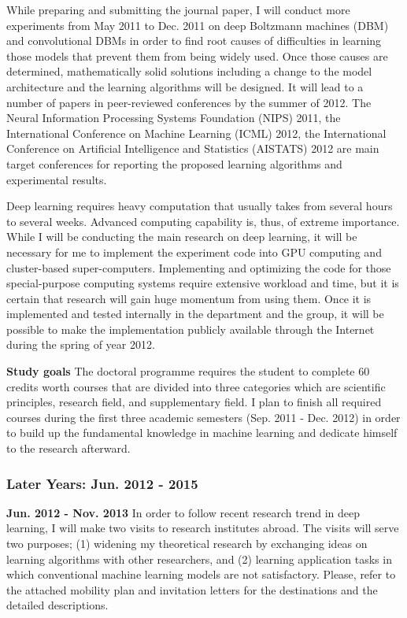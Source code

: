 \documentclass[11pt, oneside]{essay}
\begin{document}
While preparing and submitting the journal paper, I will
conduct more experiments from May 2011 to Dec. 2011 on deep
Boltzmann machines (DBM) and convolutional DBMs in order to
find root causes of difficulties in learning those models
that prevent them from being widely used. Once those causes
are determined, mathematically solid solutions including a
change to the model architecture and the learning algorithms
will be designed. It will lead to a number of papers in
peer-reviewed conferences by the summer of 2012.  The Neural
Information Processing Systems Foundation (NIPS) 2011, the
International Conference on Machine Learning (ICML) 2012,
the International Conference on Artificial Intelligence and
Statistics (AISTATS) 2012 are main target conferences for
reporting the proposed learning algorithms and experimental
results.

Deep learning requires heavy computation that usually takes
from several hours to several weeks. Advanced computing
capability is, thus, of extreme importance. While I will be
conducting the main research on deep learning, it will be
necessary for me to implement the experiment code into GPU
computing and cluster-based super-computers. Implementing
and optimizing the code for those special-purpose computing
systems require extensive workload and time, but it is
certain that research will gain huge momentum from using
them. Once it is implemented and tested internally in the
department and the group, it will be possible to make the
implementation publicly available through the Internet
during the spring of year 2012.

\textbf{Study goals} The doctoral programme requires the
student to complete 60 credits worth courses that are divided
into three categories which are scientific principles,
research field, and supplementary field. I plan to finish
all required courses during the first three academic
semesters (Sep. 2011 - Dec. 2012) in order to build up the
fundamental knowledge in machine learning and dedicate
himself to the research afterward. 

\subsubsection{Later Years: Jun. 2012 - 2015}

\textbf{Jun. 2012 - Nov. 2013} In order to follow recent
research trend in deep learning, I will make two visits to
research institutes abroad. The visits will serve two
purposes; (1) widening my theoretical research by exchanging
ideas on learning algorithms with other researchers, and (2)
learning application tasks in which conventional machine
learning models are not satisfactory. Please, refer to the
attached mobility plan and invitation letters for the
destinations and the detailed descriptions.
\end{document}
